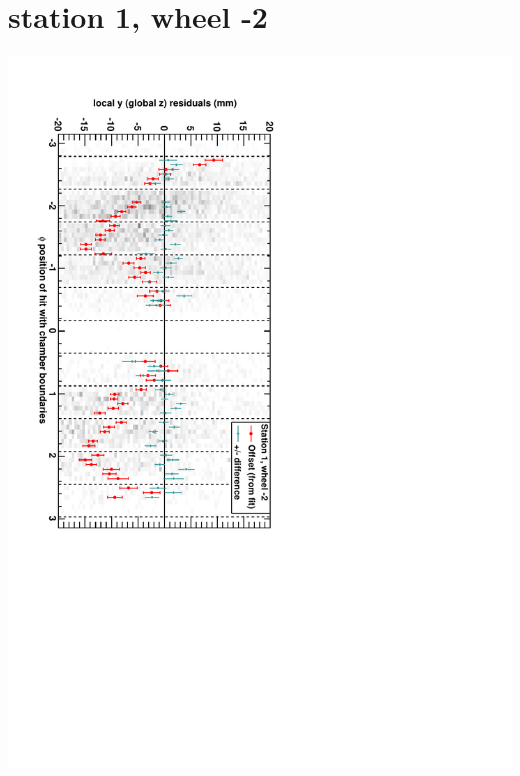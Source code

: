 \documentclass[compress]{beamer}
\begin{document}
\section*{station 1, wheel -2}
\begin{frame} \vfill \mbox{\hspace{-1 cm}\includegraphics[height=1.2\linewidth, angle=90]{DTzVsPhi_st1_whA.pdf}} \end{frame}
\end{document}
